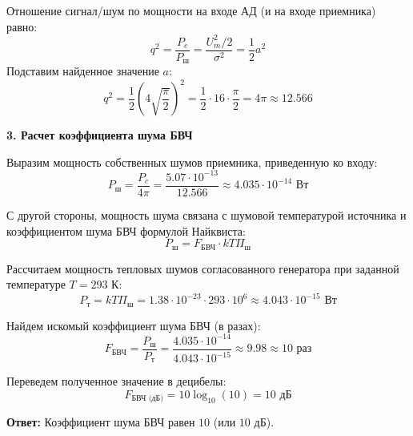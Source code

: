 Отношение сигнал/шум по мощности на входе АД (и на входе приемника) равно:
\begin{equation*}
    q^2 = \frac{P_c}{P_{\text{ш}}} = \frac{U_m^2 / 2}{\sigma^2} = \frac{1}{2} a^2
\end{equation*}
Подставим найденное значение $a$:
\begin{equation*}
    q^2 = \frac{1}{2} \left( 4 \sqrt{\frac{\pi}{2}} \right)^2 = \frac{1}{2} \cdot 16 \cdot \frac{\pi}{2} = 4\pi \approx 12.566
\end{equation*}

\vspace{1em}
\textbf{3. Расчет коэффициента шума БВЧ}

Выразим мощность собственных шумов приемника, приведенную ко входу:
\begin{equation*}
    P_{\text{ш}} = \frac{P_c}{4\pi} = \frac{5.07 \cdot 10^{-13}}{12.566} \approx 4.035 \cdot 10^{-14} \text{ Вт}
\end{equation*}

С другой стороны, мощность шума связана с шумовой температурой источника и коэффициентом шума БВЧ формулой Найквиста:
\begin{equation*}
    P_{\text{ш}} = F_{\text{БВЧ}} \cdot k T \Pi_{\text{ш}}
\end{equation*}

Рассчитаем мощность тепловых шумов согласованного генератора при заданной температуре $T = 293 \text{ К}$:
\begin{equation*}
    P_{\text{т}} = k T \Pi_{\text{ш}} = 1.38 \cdot 10^{-23} \cdot 293 \cdot 10^6 \approx 4.043 \cdot 10^{-15} \text{ Вт}
\end{equation*}

Найдем искомый коэффициент шума БВЧ (в разах):
\begin{equation*}
    F_{\text{БВЧ}} = \frac{P_{\text{ш}}}{P_{\text{т}}} = \frac{4.035 \cdot 10^{-14}}{4.043 \cdot 10^{-15}} \approx 9.98 \approx 10 \text{ раз}
\end{equation*}

Переведем полученное значение в децибелы:
\begin{equation*}
    F_{\text{БВЧ (дБ)}} = 10 \log_{10}(10) = 10 \text{ дБ}
\end{equation*}

\textbf{Ответ:} Коэффициент шума БВЧ равен $10$ (или $10 \text{ дБ}$).